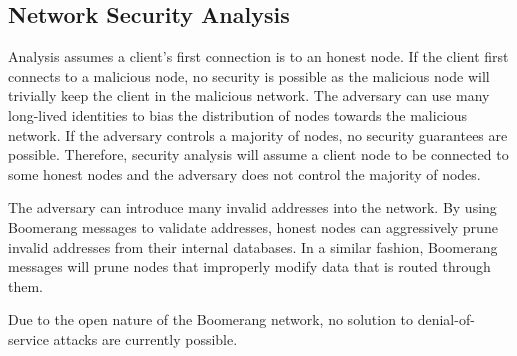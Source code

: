 

\subsection{Network Security Analysis}
Analysis assumes a client’s first connection is to an honest node. If the client first connects to a malicious node, no security is possible as the malicious node will trivially keep the client in the malicious network. The adversary can use many long-lived identities to bias the distribution of nodes towards the malicious network. If the adversary controls a majority of nodes, no security guarantees are possible.  Therefore, security analysis will assume a client node to be connected to some honest nodes and the adversary does not control the majority of nodes.

The adversary can introduce many invalid addresses into the network.  By using Boomerang messages to validate addresses, honest nodes can aggressively prune invalid addresses from their internal databases. In a similar fashion, Boomerang messages will prune nodes that improperly modify data that is routed through them.

Due to the open nature of the Boomerang network, no solution to denial-of-service attacks are currently possible.


